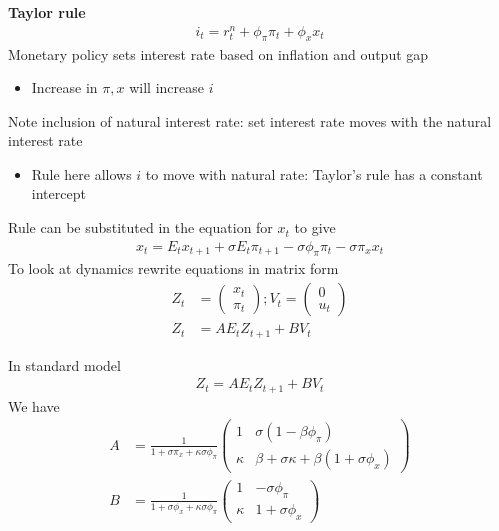 \documentclass{beamer}
\begin{document}
\begin{frame}
  \textbf{Taylor rule}  
\begin{align} 
  i_t=r_t^n+ \phi_{\pi}\pi_t+\phi_xx_t 
\end{align}
  Monetary policy sets interest rate based on inflation and output gap
  \begin{itemize}
    \item Increase in $\pi,x$ will increase $i$    
  \end{itemize}
 Note inclusion of natural interest rate: set interest rate moves with the natural interest rate
 \begin{itemize}
   \item Rule here allows $i$ to move with natural rate: Taylor's rule has a constant intercept
 \end{itemize}
\end{frame}

\begin{frame}
  Rule can be substituted in the equation for $x_t$ to give
\begin{align}  
  x_t=E_tx_{t+1} + \sigma E_t \pi_{t+1} - \sigma\phi_{\pi}\pi_t -\sigma\pi_x x_t 
\end{align}  
 To look at dynamics rewrite equations in matrix form
 \begin{align}
  Z_t&=\begin{pmatrix} x_t \\ \pi_t \end{pmatrix}; V_t=\begin{pmatrix}  0 \\u_t \end{pmatrix} \\
  Z_t&=AE_tZ_{t+1}+BV_t 
 \end{align}
\end{frame}


\begin{frame}
 In standard model
 \begin{align*}
   Z_t=AE_tZ_{t+1}+BV_t 
 \end{align*}
  We have
  \begin{align}
  A &= \frac{1}{1+\sigma\pi_x + \kappa\sigma\phi_{\pi}} \begin{pmatrix}
    1 & \sigma(1-\beta\phi_{\pi}) \\
    \kappa & \beta + \sigma\kappa + \beta(1+\sigma\phi_x)
      \end{pmatrix}\\
  B &= \frac{1}{1+\sigma\phi_x + \kappa\sigma\phi_{\pi}} \begin{pmatrix}
    1 & -\sigma\phi_{\pi}\\
    \kappa & 1+\sigma\phi_x
  \end{pmatrix}
\end{align}  
\end{frame}
\end{document}
